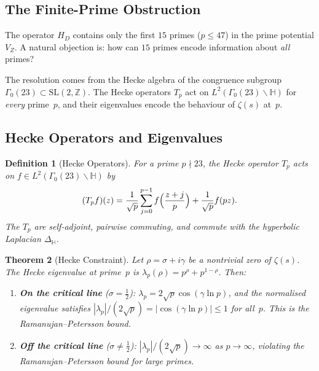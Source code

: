 \documentclass[11pt,a4paper]{article}
\theoremstyle{plain}
\newtheorem{theorem}{Theorem}[section]
\newtheorem{definition}[theorem]{Definition}
\theoremstyle{remark}
\newcommand{\Z}{\mathbb{Z}}
\begin{document}
\subsection{The Finite-Prime Obstruction}

The operator $H_D$ contains only the first $15$ primes ($p\leq 47$) in
the prime potential $V_Z$.  A natural objection is: how can $15$ primes
encode information about \emph{all} primes?

The resolution comes from the Hecke algebra of the congruence subgroup
$\Gamma_0(23)\subset\mathrm{SL}(2,\Z)$.  The Hecke operators $T_p$ act
on $L^2(\Gamma_0(23)\backslash\mathbb{H})$ for \emph{every} prime~$p$,
and their eigenvalues encode the behaviour of $\zeta(s)$ at~$p$.

\subsection{Hecke Operators and Eigenvalues}

\begin{definition}[Hecke Operators]\label{def:hecke}
For a prime $p\nmid 23$, the Hecke operator $T_p$ acts on
$f\in L^2(\Gamma_0(23)\backslash\mathbb{H})$ by
\[
  (T_p f)(z)=\frac{1}{\sqrt{p}}\sum_{j=0}^{p-1}f\Bigl(\frac{z+j}{p}\Bigr)
  +\frac{1}{\sqrt{p}}f(pz).
\]
The $T_p$ are self-adjoint, pairwise commuting, and commute with the
hyperbolic Laplacian $\Delta_{\mathbb{H}}$.
\end{definition}

\begin{theorem}[Hecke Constraint]\label{thm:hecke-constraint}
Let $\rho=\sigma+i\gamma$ be a nontrivial zero of $\zeta(s)$.
The \emph{Hecke eigenvalue} at prime~$p$ is
$\lambda_p(\rho)=p^\rho+p^{1-\rho}$.  Then:
\begin{enumerate}[nosep,label=(\roman*)]
  \item \textbf{On the critical line} ($\sigma=\tfrac{1}{2}$):
        $\lambda_p=2\sqrt{p}\cos(\gamma\ln p)$, and the normalised
        eigenvalue satisfies
        $|\lambda_p|/(2\sqrt{p})=|\cos(\gamma\ln p)|\leq 1$ for all~$p$.
        This is the Ramanujan--Petersson bound.
  \item \textbf{Off the critical line} ($\sigma\neq\tfrac{1}{2}$):
        $|\lambda_p|/(2\sqrt{p})\to\infty$ as $p\to\infty$,
        violating the Ramanujan--Petersson bound for large primes.
\end{enumerate}
\end{theorem}
\end{document}
